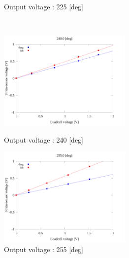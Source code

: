 \begin{figure}
\begin{minipage}[b]{0.45\linewidth}
        \caption{Output voltage : 225 [deg]}
      \end{minipage}\\
      \begin{minipage}[b]{0.45\linewidth}
        \centering
        \includegraphics[width=65mm]{../../02_workspace/result/2-1/plot/04/04_linear_2400.png}
        \caption{Output voltage : 240 [deg]}
      \end{minipage}
      \begin{minipage}[b]{0.45\linewidth}
        \centering
        \includegraphics[width=65mm]{../../02_workspace/result/2-1/plot/04/04_linear_2550.png}
        \caption{Output voltage : 255 [deg]}
      \end{minipage}
    \end{figure}

